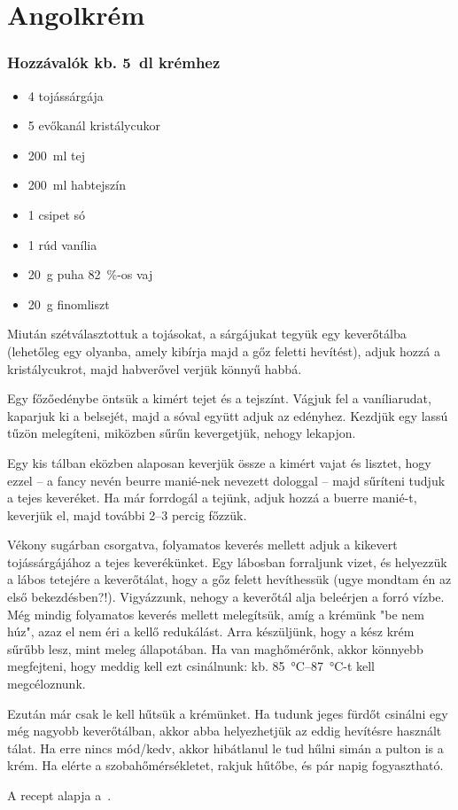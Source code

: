 \newpage
\section{Angolkrém} \label{sec:angolkem}

\subsubsection*{Hozzávalók kb. \qty{5}{\deci\l} krémhez}
\begin{itemize}
    \item \num{4} tojássárgája
    \item \num{5} evőkanál kristálycukor
    \item \qty{200}{\ml} tej
    \item \qty{200}{\ml} habtejszín
    \item \num{1} csipet só
    \item \num{1} rúd vanília
    \item \qty{20}{\g} puha \qty{82}{\percent}-os vaj
    \item \qty{20}{\g} finomliszt
\end{itemize}

Miután szétválasztottuk a tojásokat, a sárgájukat tegyük egy keverőtálba (lehetőleg egy olyanba, amely kibírja majd a gőz feletti hevítést), adjuk hozzá a kristálycukrot, majd habverővel verjük könnyű habbá.

Egy főzőedénybe öntsük a kimért tejet és a tejszínt. Vágjuk fel a vaníliarudat, kaparjuk ki a belsejét, majd a sóval együtt adjuk az edényhez. Kezdjük egy lassú tűzön melegíteni, miközben sűrűn kevergetjük, nehogy lekapjon.

Egy kis tálban eközben alaposan keverjük össze a kimért vajat és lisztet, hogy ezzel -- a fancy nevén beurre manié-nek nevezett dologgal -- majd sűríteni tudjuk a tejes keveréket. Ha már forrdogál a tejünk, adjuk hozzá a buerre manié-t, keverjük el, majd további \numrange{2}{3} percig főzzük.

Vékony sugárban csorgatva, folyamatos keverés mellett adjuk a kikevert tojássárgájához a tejes keverékünket. Egy lábosban forraljunk vizet, és helyezzük a lábos tetejére a keverőtálat, hogy a gőz felett hevíthessük (ugye mondtam én az első bekezdésben?!). Vigyázzunk, nehogy a keverőtál alja beleérjen a forró vízbe. Még mindig folyamatos keverés mellett melegítsük, amíg a krémünk "be nem húz", azaz el nem éri a kellő redukálást. Arra készüljünk, hogy a kész krém sűrűbb lesz, mint meleg állapotában. Ha van maghőmérőnk, akkor könnyebb megfejteni, hogy meddig kell ezt csinálnunk: kb. \qtyrange{85}{87}{\celsius}-t kell megcéloznunk.

Ezután már csak le kell hűtsük a krémünket. Ha tudunk jeges fürdőt csinálni egy még nagyobb keverőtálban, akkor abba helyezhetjük az eddig hevítésre használt tálat. Ha erre nincs mód/kedv, akkor hibátlanul le tud hűlni simán a pulton is a krém. Ha elérte a szobahőmérsékletet, rakjuk hűtőbe, és pár napig fogyasztható.


A recept alapja a~\cite{szell_angolkrem}.
